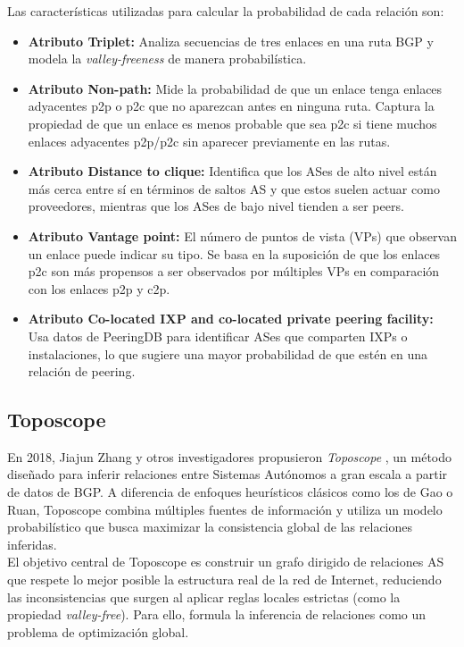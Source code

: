Las características utilizadas para calcular la probabilidad de cada relación son:
\begin{itemize}
    \item \textbf{Atributo Triplet:} Analiza secuencias de tres enlaces en una ruta BGP y modela la \textit{valley-freeness} de manera probabilística.
    \item \textbf{Atributo Non-path:} Mide la probabilidad de que un enlace tenga enlaces adyacentes p2p o p2c que no aparezcan antes en ninguna ruta. Captura la propiedad de que un enlace es menos probable que sea p2c si tiene muchos enlaces adyacentes p2p/p2c sin aparecer previamente en las rutas.
    \item \textbf{Atributo Distance to clique:} Identifica que los ASes de alto nivel están más cerca entre sí en términos de saltos AS y que estos suelen actuar como proveedores, mientras que los ASes de bajo nivel tienden a ser peers.
    \item \textbf{Atributo Vantage point:} El número de puntos de vista (VPs) que observan un enlace puede indicar su tipo. Se basa en la suposición de que los enlaces p2c son más propensos a ser observados por múltiples VPs en comparación con los enlaces p2p y c2p.
    \item \textbf{Atributo Co-located IXP and co-located private peering facility:} Usa datos de PeeringDB para identificar ASes que comparten IXPs o instalaciones, lo que sugiere una mayor probabilidad de que estén en una relación de peering.

\end{itemize}

\subsection{Toposcope} \label{sec:toposcope}

En 2018, Jiajun Zhang y otros investigadores propusieron \textit{Toposcope} \cite{Toposcope}, un método diseñado para inferir relaciones entre Sistemas Autónomos a gran escala a partir de datos de BGP. A diferencia de enfoques heurísticos clásicos como los de Gao o Ruan, Toposcope combina múltiples fuentes de información y utiliza un modelo probabilístico que busca maximizar la consistencia global de las relaciones inferidas.\\

El objetivo central de Toposcope es construir un grafo dirigido de relaciones AS que respete lo mejor posible la estructura real de la red de Internet, reduciendo las inconsistencias que surgen al aplicar reglas locales estrictas (como la propiedad \textit{valley-free}). Para ello, formula la inferencia de relaciones como un problema de optimización global.\\

